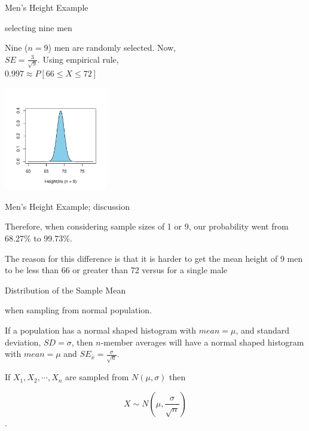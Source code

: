 \documentclass[14pt]{beamer}\usepackage[]{graphicx}\usepackage[]{color}
\begin{document}
\begin{frame}[fragile]{Men's Height Example}

\begin{minipage}[ht]{5cm}

selecting nine men

{\small{
Nine ($n = 9$) men are randomly selected.  Now, \\ $SE = \frac{3}{\sqrt{9}}$.  Using empirical  rule, \\
$0.997 \approx P[66 \le X \le 72]$
}}
\end{minipage} 
\begin{minipage}[ht]{5cm}


\includegraphics[width=4.5cm]{figure/LBL10c-1} 


\end{minipage}
\end{frame}

\begin{frame}[fragile]{Men’s Height Example; discussion}

Therefore, when considering sample sizes of 1 or 9, our probability  went from 68.27\% to 99.73\%.

\vspace{3mm}

The reason for this difference is that it is harder to get the mean height of 9 men to be less than 66 or greater than 72 versus for a single male

\end{frame}

\begin{frame}[fragile]{Distribution of the Sample Mean}

when sampling from normal population.

If a population has a normal shaped histogram with $mean = \mu$, and standard deviation, $SD = \sigma$, then $n$-member averages will have a normal shaped histogram with $mean = \mu$ and $SE_{\bar{x}} = \frac{\sigma}{\sqrt{n}}$.


If $X_1, X_2, \cdots , X_n$ are sampled from $N(\mu, \sigma)$ then

$$ X \sim N( \mu, \frac{\sigma}{\sqrt{n}})$$.

\end{frame}
\end{document}
